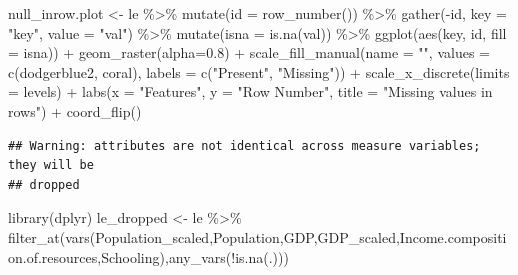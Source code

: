 \documentclass[
]{article}
\newenvironment{Shaded}{\begin{snugshade}}{\end{snugshade}}
\newcommand{\AttributeTok}[1]{\textcolor[rgb]{0.77,0.63,0.00}{#1}}
\newcommand{\FloatTok}[1]{\textcolor[rgb]{0.00,0.00,0.81}{#1}}
\newcommand{\FunctionTok}[1]{\textcolor[rgb]{0.00,0.00,0.00}{#1}}
\newcommand{\NormalTok}[1]{#1}
\newcommand{\OtherTok}[1]{\textcolor[rgb]{0.56,0.35,0.01}{#1}}
\newcommand{\SpecialCharTok}[1]{\textcolor[rgb]{0.00,0.00,0.00}{#1}}
\newcommand{\StringTok}[1]{\textcolor[rgb]{0.31,0.60,0.02}{#1}}
\begin{document}
\begin{Shaded}
\begin{Highlighting}[]
\NormalTok{null\_inrow.plot }\OtherTok{\textless{}{-}}\NormalTok{ le }\SpecialCharTok{\%\textgreater{}\%}
  \FunctionTok{mutate}\NormalTok{(}\AttributeTok{id =} \FunctionTok{row\_number}\NormalTok{()) }\SpecialCharTok{\%\textgreater{}\%}
  \FunctionTok{gather}\NormalTok{(}\SpecialCharTok{{-}}\NormalTok{id, }\AttributeTok{key =} \StringTok{"key"}\NormalTok{, }\AttributeTok{value =} \StringTok{"val"}\NormalTok{) }\SpecialCharTok{\%\textgreater{}\%}
  \FunctionTok{mutate}\NormalTok{(}\AttributeTok{isna =} \FunctionTok{is.na}\NormalTok{(val)) }\SpecialCharTok{\%\textgreater{}\%}
  \FunctionTok{ggplot}\NormalTok{(}\FunctionTok{aes}\NormalTok{(key, id, }\AttributeTok{fill =}\NormalTok{ isna)) }\SpecialCharTok{+}
    \FunctionTok{geom\_raster}\NormalTok{(}\AttributeTok{alpha=}\FloatTok{0.8}\NormalTok{) }\SpecialCharTok{+}
    \FunctionTok{scale\_fill\_manual}\NormalTok{(}\AttributeTok{name =} \StringTok{""}\NormalTok{,}
        \AttributeTok{values =} \FunctionTok{c}\NormalTok{(}\StringTok{\textquotesingle{}dodgerblue2\textquotesingle{}}\NormalTok{, }\StringTok{\textquotesingle{}coral\textquotesingle{}}\NormalTok{),}
        \AttributeTok{labels =} \FunctionTok{c}\NormalTok{(}\StringTok{"Present"}\NormalTok{, }\StringTok{"Missing"}\NormalTok{)) }\SpecialCharTok{+}
    \FunctionTok{scale\_x\_discrete}\NormalTok{(}\AttributeTok{limits =}\NormalTok{ levels) }\SpecialCharTok{+}
    \FunctionTok{labs}\NormalTok{(}\AttributeTok{x =} \StringTok{"Features"}\NormalTok{, }\AttributeTok{y =} \StringTok{"Row Number"}\NormalTok{, }\AttributeTok{title =} \StringTok{"Missing values in rows"}\NormalTok{) }\SpecialCharTok{+}
    \FunctionTok{coord\_flip}\NormalTok{()}
\end{Highlighting}
\end{Shaded}

\begin{verbatim}
## Warning: attributes are not identical across measure variables; they will be
## dropped
\end{verbatim}

\begin{Shaded}
\begin{Highlighting}[]
\FunctionTok{library}\NormalTok{(dplyr)}
\NormalTok{le\_dropped }\OtherTok{\textless{}{-}}\NormalTok{ le }\SpecialCharTok{\%\textgreater{}\%} \FunctionTok{filter\_at}\NormalTok{(}\FunctionTok{vars}\NormalTok{(Population\_scaled,Population,GDP,GDP\_scaled,Income.composition.of.resources,Schooling),}\FunctionTok{any\_vars}\NormalTok{(}\SpecialCharTok{!}\FunctionTok{is.na}\NormalTok{(.)))}
\end{Highlighting}
\end{Shaded}
\end{document}
